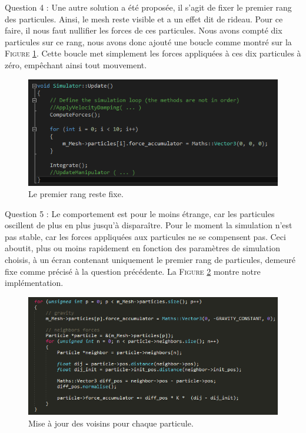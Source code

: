 \documentclass[a4paper,12pt]{article}
\begin{document}
Question 4 : Une autre solution a été proposée, il s'agit de fixer le premier rang des particules. Ainsi, le mesh reste visible et a un effet dit \og{}de rideau\fg{}. Pour ce faire, il nous faut nullifier les forces de ces particules. Nous avons compté dix particules sur ce rang, nous avons donc ajouté une boucle comme montré sur la \textsc{Figure} \ref{fig:q4}. Cette boucle met simplement les forces appliquées à ces dix particules à zéro, empêchant ainsi tout mouvement.
\begin{figure}
  \centering
  \includegraphics{q4.png}
  \caption{Le premier rang reste fixe.}
  \label{fig:q4}
\end{figure}

Question 5 : Le comportement est pour le moins étrange, car les particules oscillent de plus en plus jusqu'à disparaître. Pour le moment la simulation n'est pas stable, car les forces appliquées aux particules ne se compensent pas. Ceci aboutit, plus ou moins rapidement en fonction des paramètres de simulation choisis, à un écran contenant uniquement le premier rang de particules, demeuré fixe comme précisé à la question précédente.
La \textsc{Figure} \ref{fig:q5} montre notre implémentation.
\begin{figure}
  \centering
  \includegraphics{q5.png}
  \caption{Mise à jour des voisins pour chaque particule.}
  \label{fig:q5}
\end{figure}
\end{document}
